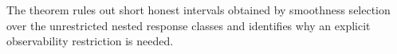 The theorem rules out short honest intervals obtained by smoothness selection over the unrestricted nested response classes and identifies why an explicit observability restriction is needed.